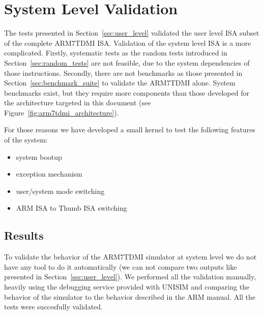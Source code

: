 \section{System Level Validation}
\label{sec:system_level}

The tests presented in Section~\ref{sec:user_level} validated the user level ISA subset of the complete ARM7TDMI ISA.
Validation of the system level ISA is a more complicated.
Firstly, systematic tests as the random tests introduced in Section~\ref{sec:random_tests} are not feasible, due to the system dependencies of those instructions.
Secondly, there are not benchmarks as those presented in Section~\ref{sec:benchmark_suite} to validate the ARM7TDMI alone.
System benchmarks exist, but they require more components than those developed for the architecture targeted in this document (see Figure~\ref{fig:arm7tdmi_architecture}).

For those reasons we have developed a small kernel to test the following features of the system:
\begin{itemize}
	\item system bootup
	\item exception mechanism
	\item user/system mode switching
	\item ARM ISA to Thumb ISA switching
\end{itemize}

\subsection{Results}
To validate the behavior of the ARM7TDMI simulator at system level we do not have any tool to do it automatically (we can not compare two outputs like presented in Section~\ref{sec:user_level}).
We performed all the validation manually, heavily using the debugging service provided with UNISIM and comparing the behavior of the simulator to the behavior described in the ARM manual.
All the tests were succesfully validated.
